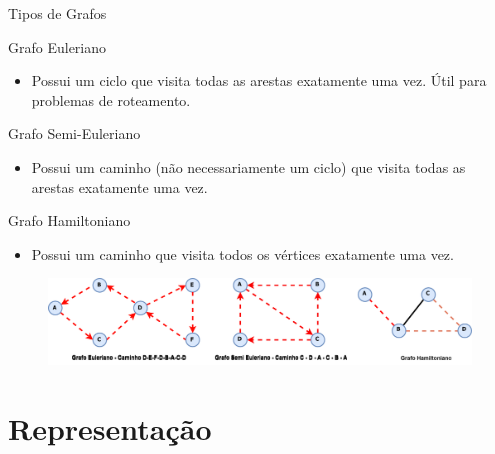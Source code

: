 \documentclass{if-beamer}
\begin{document}
\begin{frame}{Tipos de Grafos} 

\justifying
Grafo Euleriano
\begin{itemize}
\item  Possui um ciclo que visita todas as arestas exatamente uma vez. Útil para problemas de roteamento.
\end{itemize} 
Grafo Semi-Euleriano
\begin{itemize}
\item  Possui um caminho (não necessariamente um ciclo) que visita todas as arestas exatamente uma vez.
\end{itemize} 
Grafo Hamiltoniano
\begin{itemize}
\item  Possui um caminho que visita todos os vértices exatamente uma vez.
\end{itemize} 

\begin{figure}[h]
\centering

  \includegraphics[scale=0.40]{Figuras/exemplos-grafo/p_svg-tex.pdf}
  
  \label{fig:imagem1}
\end{figure}
\end{frame}


\section{Representação}
\end{document}

